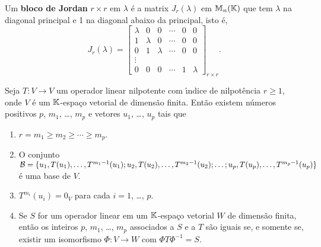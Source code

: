 \begin{definicao}
    Um \textbf{bloco de Jordan} $r \times r$ em $\lambda$ \'e a matrix $J_r(\lambda)$ em $\mathbb{M}_n(\mathbb{K})$ que tem $\lambda$ na diagonal principal e 1 na diagonal abaixo da principal, isto \'e,
    \[
    J_r(\lambda) = \begin{bmatrix}
        \lambda & 0 & 0 & \cdots & 0 & 0\\
        1 & \lambda & 0 & \cdots & 0 & 0\\
        0 & 1 & \lambda & \cdots & 0 & 0\\
        \vdots\\
        0 & 0 & 0 & \cdots & 1 & \lambda
    \end{bmatrix}_{r \times r}.
\]
\end{definicao}

\begin{teorema}\label{operador_nilpotente}
    Seja $T : V \to V$ um operador linear nilpotente com {\'\i}ndice de nilpot\^encia $r \ge 1$, onde $V$ \'e um $\mathbb{K}$-espa\c{c}o vetorial de dimens\~ao finita. Ent\~ao existem n\'umeros positivos $p$, $m_1$, \dots, $m_p$ e vetores $u_1$, \dots, $u_p$ tais que
    \begin{enumerate}[label=({\roman*})]
        \item\label{propriedade_i_operado_nilpotente} $r = m_1 \ge m_2 \ge \cdots \ge m_p$.
        \item\label{propriedade_ii_operado_nilpotente} O conjunto $\mathcal{B} = \{u_1, T(u_1), \dots, T^{m_1 - 1}(u_1); u_2, T(u_2), \dots, T^{m_2 - 1}(u_2); \dots; u_p, T(u_p), \dots, \linebreak T^{m_p - 1}(u_p)\}$ \'e uma base de $V$.
        \item\label{propriedade_iii_operado_nilpotente} $T^{m_i}(u_i) = 0_V$ para cada $i = 1$, \dots, $p$.
        \item\label{propriedade_iv_operado_nilpotente} Se $S$ for um operador linear em um $\mathbb{K}$-espa\c{c}o vetorial $W$ de dimens\~ao finita, ent\~ao os inteiros $p$, $m_1$, \dots, $m_p$ associados a $S$ e a $T$ s\~ao iguais se, e somente se, existir um isomorfismo $\Phi : V \to W$ com $\Phi T \Phi^{-1} = S$.
    \end{enumerate}
\end{teorema}

